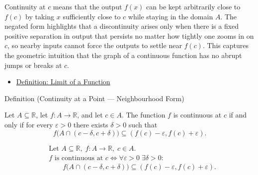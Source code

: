 \begin{remark*}[Interpretation]
Continuity at $c$ means that the output $f(x)$ can be kept arbitrarily close to $f(c)$ by taking $x$ sufficiently close to $c$ while staying in the domain $A$. The negated form highlights that a discontinuity arises only when there is a fixed positive separation in output that persists no matter how tightly one zooms in on $c$, so nearby inputs cannot force the outputs to settle near $f(c)$. This captures the geometric intuition that the graph of a continuous function has no abrupt jumps or breaks at $c$.
\end{remark*}

\begin{remark*}[Dependencies]
\begin{itemize}
  \item \hyperref[def:limit-function]{Definition: Limit of a Function}
\end{itemize}
\end{remark*}


\begin{definitionbox}{Definition (Continuity at a Point --- Neighbourhood Form)}
\begin{definition}
\label{def:continuous-at-point-nbhd}
Let $A \subseteq \mathbb{R}$, let $f : A \to \mathbb{R}$, and let $c \in A$. The function $f$ is continuous at $c$ if and only if for every $\varepsilon > 0$ there exists $\delta > 0$ such that
\[
f\bigl(A \cap (c-\delta, c+\delta)\bigr) \subseteq (f(c)-\varepsilon, f(c)+\varepsilon).
\]
\end{definition}
\end{definitionbox}

\begin{remark*}
\[
\begin{aligned}
&\text{Let } A \subseteq \mathbb{R},\; f:A \to \mathbb{R},\; c \in A.\\
&f \text{ is continuous at } c \Longleftrightarrow \forall \varepsilon > 0\; \exists \delta > 0:\\
&\qquad f\bigl(A \cap (c-\delta, c+\delta)\bigr) \subseteq (f(c)-\varepsilon, f(c)+\varepsilon).
\end{aligned}
\]
\end{remark*}

